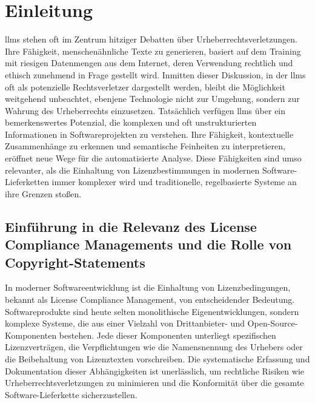 \chapter{Einleitung}\label{ch:einleitung}

\glspl{llm} stehen oft im Zentrum hitziger Debatten über Urheberrechtsverletzungen.
Ihre Fähigkeit, menschenähnliche Texte zu generieren, basiert auf dem Training mit riesigen Datenmengen aus dem Internet, deren Verwendung rechtlich und ethisch zunehmend in Frage gestellt wird.
Inmitten dieser Diskussion, in der \glspl{llm} oft als potenzielle Rechtsverletzer dargestellt werden, bleibt die Möglichkeit weitgehend unbeachtet, ebenjene Technologie nicht zur Umgehung, sondern zur Wahrung des Urheberrechts einzusetzen.
Tatsächlich verfügen \glspl{llm} über ein bemerkenswertes Potenzial, die komplexen und oft unstrukturierten Informationen in Softwareprojekten zu verstehen.
Ihre Fähigkeit, kontextuelle Zusammenhänge zu erkennen und semantische Feinheiten zu interpretieren, eröffnet neue Wege für die automatisierte Analyse.
Diese Fähigkeiten sind umso relevanter, als die Einhaltung von Lizenzbestimmungen in modernen Software-Lieferketten immer komplexer wird und traditionelle, regelbasierte Systeme an ihre Grenzen stoßen.


\section{Einführung in die Relevanz des License Compliance Managements und die Rolle von Copyright-Statements}\label{sec:einfuhrung}

In moderner Softwareentwicklung ist die Einhaltung von Lizenzbedingungen, bekannt als License Compliance Management, von entscheidender Bedeutung.
Softwareprodukte sind heute selten monolithische Eigenentwicklungen, sondern komplexe Systeme, die aus einer Vielzahl von Drittanbieter- und Open-Source-Komponenten bestehen.
Jede dieser Komponenten unterliegt spezifischen Lizenzverträgen, die Verpflichtungen wie die Namensnennung des Urhebers oder die Beibehaltung von Lizenztexten vorschreiben.
Die systematische Erfassung und Dokumentation dieser Abhängigkeiten ist unerlässlich, um rechtliche Risiken wie Urheberrechtsverletzungen zu minimieren und die Konformität über die gesamte Software-Lieferkette sicherzustellen.

